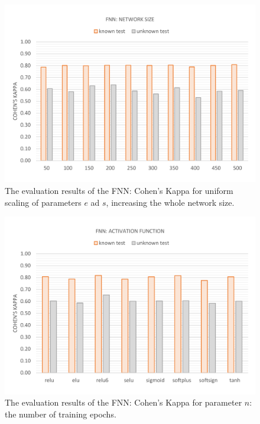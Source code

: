 \vspace{-11mm}
\begin{figure}[H]
	\centering\includegraphics[width=\textwidth]{images/evaluation_fnn_es_k}
	\caption[FNN Evaluation: Network Size]{The evaluation results of the FNN: Cohen's Kappa for uniform scaling of parameters $e$ ad $s$, increasing the whole network size.}
	\label{f.evaluation.fnn.es.k}
\end{figure}

\vspace{-11mm}
\begin{figure}[H]
	\centering\includegraphics[width=\textwidth]{images/evaluation_fnn_a_k}
	\caption[FNN Evaluation: Number of Training Epochs]{The evaluation results of the FNN: Cohen's Kappa for parameter $n$: the number of training epochs.}
	\label{f.evaluation.fnn.a.k}
\end{figure}

